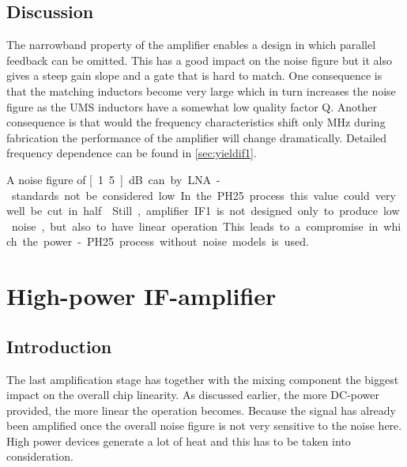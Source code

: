 		\subsection{Discussion}
			The narrowband property of the amplifier enables a design in which parallel feedback can be omitted. This has a good impact on the noise figure but it also gives a steep gain slope and a gate that is hard to match. One consequence is that the matching inductors become very large which in turn increases the noise figure as the UMS inductors have a somewhat low quality factor Q. Another consequence is that would the frequency characteristics shift only \unit[100]{MHz} during fabrication the performance of the amplifier will change dramatically. Detailed frequency dependence can be found in \autoref{sec:yieldif1}.

			A noise figure of \unit[1.5]{dB} can by LNA-standards not be considered low. In the PH25 process this value could very well be cut in half.\autocite{kyuko96} Still, amplifier IF1 is not designed only to produce  low  noise, but also to have linear operation. This leads to a compromise in which the power-PH25 process without noise models is used.


	\section{High-power IF-amplifier}
		\subsection{Introduction}\label{sec:if2power}
			The last amplification stage has together with the mixing component the biggest impact on the overall chip linearity. As discussed earlier, the more DC-power provided, the more linear the operation becomes. Because the signal has already been amplified once the overall noise figure is not very sensitive to the noise here. High power devices generate a lot of heat and this has to be taken into consideration.

